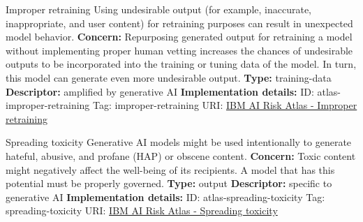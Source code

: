 \documentclass[a4paper,12pt]{article}
\begin{document}
\begin{definitionbox}{Improper retraining}
Using undesirable output (for example, inaccurate, inappropriate, and user content) for retraining purposes can result in unexpected model behavior.\newline\newline
\textbf{Concern: }Repurposing generated output for retraining a model without implementing proper human vetting increases the chances of undesirable outputs to be incorporated into the training or tuning data of the model. In turn, this model can generate even more undesirable output.\newline\newline
\textbf{Type: }training-data\newline
\textbf{Descriptor: }amplified by generative AI \newline\newline
\textbf{Implementation details: } \newline
ID: atlas-improper-retraining \newline
Tag: improper-retraining \newline
URI:  \href{https://www.ibm.com/docs/en/watsonx/saas?topic=SSYOK8/wsj/ai-risk-atlas/improper-retraining.html}{IBM AI Risk Atlas - Improper retraining}\newline
\end{definitionbox}
\begin{definitionbox}{Spreading toxicity}
Generative AI models might be used intentionally to generate hateful, abusive, and profane (HAP) or obscene content.\newline\newline
\textbf{Concern: }Toxic content might negatively affect the well-being of its recipients. A model that has this potential must be properly governed.\newline\newline
\textbf{Type: }output\newline
\textbf{Descriptor: }specific to generative AI \newline\newline
\textbf{Implementation details: } \newline
ID: atlas-spreading-toxicity \newline
Tag: spreading-toxicity \newline
URI:  \href{https://www.ibm.com/docs/en/watsonx/saas?topic=SSYOK8/wsj/ai-risk-atlas/spreading-toxicity.html}{IBM AI Risk Atlas - Spreading toxicity}\newline
\end{definitionbox}
\end{document}
